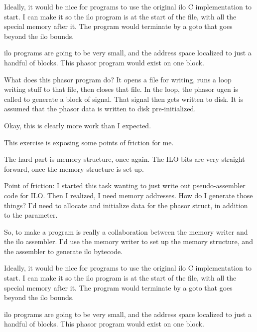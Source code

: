 Ideally, it would be nice for programs to use the original ilo C implementation to start. I can make it so the ilo program is at the start of the file, with all the special memory after it. The program would terminate by a goto that goes beyond the ilo bounds.
\par

ilo programs are going to be very small, and the address space localized to just a handful of blocks. This phasor program would exist on one block.
\par

What does this phasor program do? It opens a file for writing, runs a loop writing stuff to that file, then closes that file. In the loop, the phasor ugen is called to generate a block of signal. That signal then gets written to disk. It is assumed that the phasor data is written to disk pre-initialized.
\par

Okay, this is clearly more work than I expected.
\par

This exercise is exposing some points of friction for me.
\par

The hard part is memory structure, once again. The ILO bits are very straight forward, once the memory structure is set up.
\par

Point of friction: I started this task wanting to just write out pseudo-assembler code for ILO. Then I realized, I need memory addresses. How do I generate those things? I'd need to allocate and initialize data for the phasor struct, in addition to the parameter.
\par

So, to make a program is really a collaboration between the memory writer and the ilo assembler. I'd use the memory writer to set up the memory structure, and the assembler to generate ilo bytecode.
\par

Ideally, it would be nice for programs to use the original ilo C implementation to start. I can make it so the ilo program is at the start of the file, with all the special memory after it. The program would terminate by a goto that goes beyond the ilo bounds.
\par

ilo programs are going to be very small, and the address space localized to just a handful of blocks. This phasor program would exist on one block.
\par

